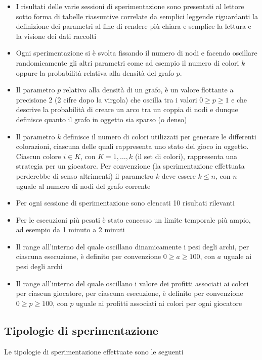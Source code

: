 \begin{itemize}
	\item I risultati delle varie sessioni di sperimentazione sono presentati al lettore sotto forma di tabelle riassuntive correlate da semplici leggende riguardanti la definizione dei parametri al fine di rendere più chiara e semplice la lettura e la visione dei dati raccolti
	\item Ogni sperimentazione si è svolta fissando il numero di nodi e facendo oscillare randomicamente gli altri parametri come ad esempio il numero di colori $k$ oppure la probabilità relativa alla densità del grafo $p$.\\
	\item Il parametro $p$ relativo alla densità di un grafo, è un valore flottante a precisione 2 (2 cifre dopo la virgola) che oscilla tra i valori \(0 \geq p \geq 1\) e che descrive la probabilità di creare un arco tra un coppia di nodi e dunque definisce quanto il grafo in oggetto sia sparso (o denso)
	\item Il parametro $k$ definisce il numero di colori utilizzati per generare le differenti colorazioni, ciascuna delle quali rappresenta uno stato del gioco in oggetto. Ciascun colore \(i \in K\), con \(K = 1,\ldots,k\) (il set di colori), rappresenta una strategia per un giocatore. Per convenzione (la sperimentazione effettuata perderebbe di senso altrimenti) il parametro $k$ deve essere \(k \leq n\), con $n$ uguale al numero di nodi del grafo corrente
	\item Per ogni sessione di sperimentazione sono elencati 10 risultati rilevanti 
	\item Per le esecuzioni più pesati è stato concesso un limite temporale più ampio, ad esempio da 1 minuto a 2 minuti
	\item Il range all'interno del quale oscillano dinamicamente i pesi degli archi, per ciascuna esecuzione, è definito per convenzione \(0 \geq a \geq 100\), con $a$ uguale ai pesi degli archi
	\item Il range all'interno del quale oscillano i valore dei profitti associati ai colori per ciascun giocatore, per ciascuna esecuzione, è definito per convenzione \(0 \geq p \geq 100\), con $p$ uguale ai profitti associati ai colori per ogni giocatore
\end{itemize}

\subsection{Tipologie di sperimentazione}
\justify
Le tipologie di sperimentazione effettuate sono le seguenti

